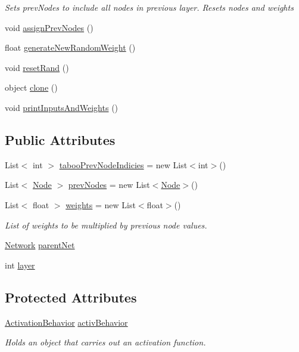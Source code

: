\begin{DoxyCompactItemize}
\begin{DoxyCompactList}\small\item\em Sets prev\+Nodes to include all nodes in previous layer. Resets nodes and weights \end{DoxyCompactList}\item 
void \mbox{\hyperlink{class_non_input_node_abd2e854cfd7c52bc91bd8a14df972a79}{assign\+Prev\+Nodes}} ()
\item 
float \mbox{\hyperlink{class_non_input_node_a8368526477286eba442737fa000fef16}{generate\+New\+Random\+Weight}} ()
\item 
void \mbox{\hyperlink{class_non_input_node_a7d9c289b2c8d666a3d9ae69e1f536cfa}{reset\+Rand}} ()
\item 
object \mbox{\hyperlink{class_non_input_node_a4aadcefa9b95598c8d8c985e0e690041}{clone}} ()
\item 
void \mbox{\hyperlink{class_non_input_node_a67de84779fee28a0db7b5b10b84f9db6}{print\+Inputs\+And\+Weights}} ()
\end{DoxyCompactItemize}
\subsection*{Public Attributes}
\begin{DoxyCompactItemize}
\item 
List$<$ int $>$ \mbox{\hyperlink{class_non_input_node_a8bbea5d8230dac63fd88d987e5eb41a7}{taboo\+Prev\+Node\+Indicies}} = new List$<$int$>$()
\item 
List$<$ \mbox{\hyperlink{class_node}{Node}} $>$ \mbox{\hyperlink{class_non_input_node_ad4f05e0609cd43ea03edfd9937f4e3b9}{prev\+Nodes}} = new List$<$\mbox{\hyperlink{class_node}{Node}}$>$()
\item 
List$<$ float $>$ \mbox{\hyperlink{class_non_input_node_a4c2ddced3cd3b741bbf5253dd69661d2}{weights}} = new List$<$float$>$()
\begin{DoxyCompactList}\small\item\em List of weights to be multiplied by previous node values. \end{DoxyCompactList}\item 
\mbox{\hyperlink{class_network}{Network}} \mbox{\hyperlink{class_non_input_node_ac79615aee9a2b85aa9c31f98451da37a}{parent\+Net}}
\item 
int \mbox{\hyperlink{class_non_input_node_a5614e202d11fbe3ca55ec88e6e803cb8}{layer}}
\end{DoxyCompactItemize}
\subsection*{Protected Attributes}
\begin{DoxyCompactItemize}
\item 
\mbox{\hyperlink{interface_activation_behavior}{Activation\+Behavior}} \mbox{\hyperlink{class_non_input_node_ab33f9a611488e5dfcb697941736f5cfc}{activ\+Behavior}}
\begin{DoxyCompactList}\small\item\em Holds an object that carries out an activation function. \end{DoxyCompactList}\end{DoxyCompactItemize}


